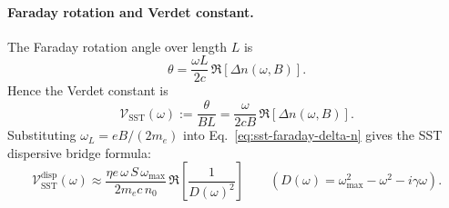 \documentclass[10pt]{article}
\begin{document}
        \paragraph{Faraday rotation and Verdet constant.}
            The Faraday rotation angle over length \(L\) is
            \begin{equation}
                \theta=\frac{\omega L}{2c}\,\Re\!\left[\Delta n(\omega,B)\right].
                \label{eq:sst-faraday-theta}
            \end{equation}
            Hence the Verdet constant is
            \begin{equation}
                \mathcal{V}_{\mathrm{SST}}(\omega)
                :=\frac{\theta}{BL}
                =
                \frac{\omega}{2cB}\,\Re\!\left[\Delta n(\omega,B)\right].
                \label{eq:sst-faraday-verdet-def}
            \end{equation}
            Substituting \(\omega_L=eB/(2m_e)\) into Eq.~\eqref{eq:sst-faraday-delta-n} gives the SST dispersive bridge formula:
            \begin{equation}
                \boxed{
                    \mathcal{V}_{\mathrm{SST}}^{\mathrm{disp}}(\omega)
                    \approx
                    \frac{\eta e\,\omega\,S\,\omega_{\max}}{2m_e c\,n_0}\,
                    \Re\!\left[\frac{1}{D(\omega)^2}\right]
                }
                \qquad
                \left(D(\omega)=\omega_{\max}^2-\omega^2-i\gamma\omega\right).
                \label{eq:sst-faraday-verdet-disp}
            \end{equation}
\end{document}
